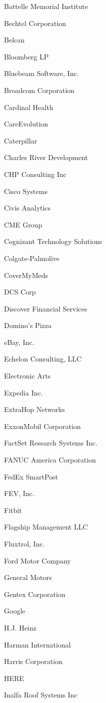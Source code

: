 \documentclass[twoside]{article}
\begin{document}
\begin{center}
\begin{multicols}{5}
\begin{FlushLeft}
\begin{compactitem}
\item Battelle Memorial Institute
\item Bechtel Corporation
\item Belcan
\item Bloomberg LP
\item Bluebeam Software, Inc.
\item Broadcom Corporation
\item Cardinal Health
\item CareEvolution
\item Caterpillar
\item Charles River Development
\item CHP Consulting Inc
\item Cisco Systems
\item Civis Analytics
\item CME Group
\item Cognizant Technology Solutions
\item Colgate-Palmolive
\item CoverMyMeds
\item DCS Corp
\item Discover Financial Services
\item Domino's Pizza
\item eBay, Inc.
\item Echelon Consulting, LLC
\item Electronic Arts
\item Expedia Inc.
\item ExtraHop Networks
\item ExxonMobil Corporation
\item FactSet Research Systems Inc.
\item FANUC America Corporation
\item FedEx SmartPost
\item FEV, Inc.
\item Fitbit
\item Flagship Management LLC
\item Fluxtrol, Inc.
\item Ford Motor Company
\item General Motors
\item Gentex Corporation
\item Google
\item H.J. Heinz
\item Harman International
\item Harris Corporation
\item HERE
\item Inalfa Roof Systems Inc

\end{compactitem}
\end{FlushLeft}
\end{multicols}
\end{center}
\end{document}
